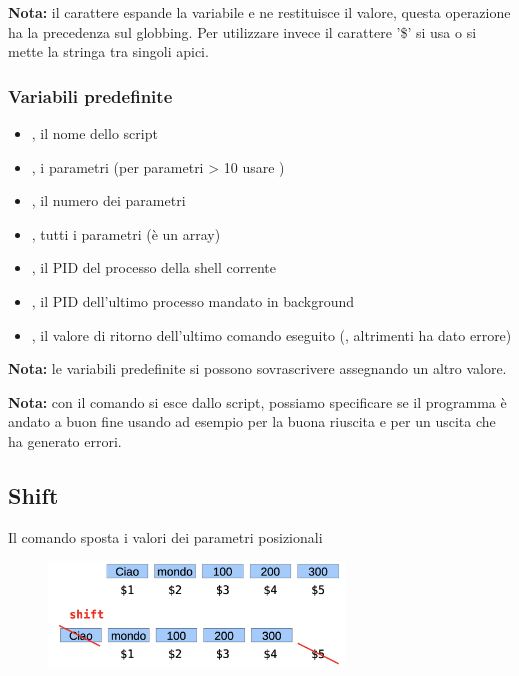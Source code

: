 \documentclass[../main.tex]{subfiles}
\begin{document}
\textbf{Nota:} il carattere \code{\$} espande la variabile e ne restituisce il valore, questa operazione ha la precedenza sul globbing.
Per utilizzare invece il carattere '\$' si usa \code{\textbackslash\$} o si mette la stringa tra singoli apici.

\subsubsection{Variabili predefinite}
\begin{itemize}
    \item {}, il nome dello script
    \item {}, i parametri (per parametri > 10 usare )
    \item \code{\$\#}, il numero dei parametri
    \item {}, tutti i parametri (è un array)
    \item \code{\$\$}, il PID del processo della shell corrente
    \item \code{\$!}, il PID dell'ultimo processo mandato in background
    \item {}, il valore di ritorno dell'ultimo comando eseguito (, altrimenti ha dato errore)
\end{itemize}
\textbf{Nota:} le variabili predefinite si possono sovrascrivere assegnando un altro valore.

\textbf{Nota:} con il comando  si esce dallo script, possiamo specificare se il programma è andato a buon fine usando ad esempio
 per la buona riuscita e  per un uscita che ha generato errori.


\pagebreak
\subsection{Shift}
Il comando  sposta i valori dei parametri posizionali
\begin{figure}[h]
    \centering
    \includegraphics[width=0.7\textwidth]{../images/shift.png}
\end{figure}
\end{document}
